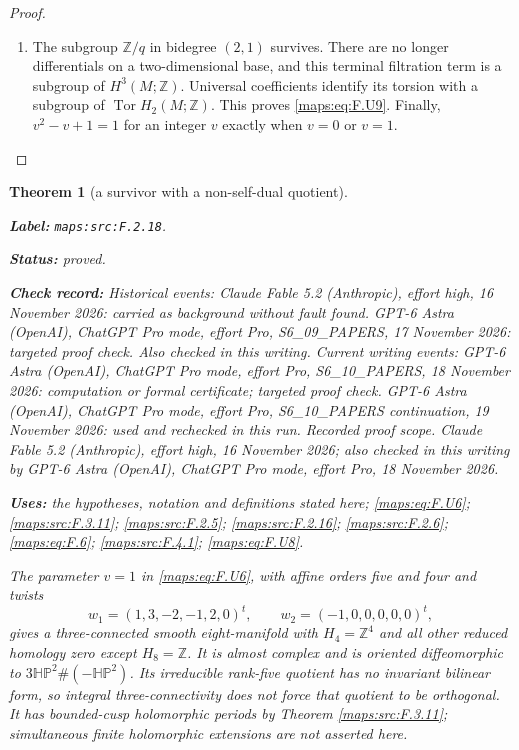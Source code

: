 \documentclass[11pt,a4paper]{article}
\newtheorem{theorem}{Theorem}[section]
\theoremstyle{definition}
\newcommand{\StatementRecord}[4]{\par\smallskip\begingroup\upshape\raggedright\noindent\textbf{Label:} \nolinkurl{#1}.\par\noindent\textbf{Status:} #2.\par\noindent\textbf{Check record:} #3.\par\noindent\textbf{Uses:} #4.\par\endgroup\smallskip}
\begin{document}
\begin{proof}
\begin{enumerate}[label=\arabic*.]
\item The subgroup $\mathbb Z/q$ in bidegree $(2,1)$ survives.
There are no longer differentials on a two-dimensional base,
and this terminal filtration term is a subgroup of
$H^3(M;\mathbb Z)$.  Universal coefficients identify its
torsion with a subgroup of $\operatorname{Tor}H_2(M;\mathbb Z)$.
This proves \eqref{maps:eq:F.U9}.  Finally, $v^2-v+1=1$ for an integer $v$
exactly when $v=0$ or $v=1$.

\end{enumerate}
\end{proof}




\begin{theorem}[a survivor with a non-self-dual quotient]\label{maps:src:F.2.18}
\StatementRecord{maps:src:F.2.18}{proved}{Historical events: Claude Fable 5.2 (Anthropic), effort high, 16 November 2026: carried as background without fault found. GPT-6 Astra (OpenAI), ChatGPT Pro mode, effort Pro, S6\_09\_PAPERS, 17 November 2026: targeted proof check. Also checked in this writing. Current writing events: GPT-6 Astra (OpenAI), ChatGPT Pro mode, effort Pro, S6\_10\_PAPERS, 18 November 2026: computation or formal certificate; targeted proof check. GPT-6 Astra (OpenAI), ChatGPT Pro mode, effort Pro, S6\_10\_PAPERS continuation, 19 November 2026: used and rechecked in this run. \emph{Recorded proof scope.} Claude Fable 5.2 (Anthropic), effort high, 16 November 2026; also checked in this writing by GPT-6 Astra (OpenAI), ChatGPT Pro mode, effort Pro, 18 November 2026}{the hypotheses, notation and definitions stated here; \cref{maps:eq:F.U6}; \cref{maps:src:F.3.11}; \cref{maps:src:F.2.5}; \cref{maps:src:F.2.16}; \cref{maps:src:F.2.6}; \cref{maps:eq:F.6}; \cref{maps:src:F.4.1}; \cref{maps:eq:F.U8}}


The parameter $v=1$ in \eqref{maps:eq:F.U6}, with affine orders five and four
and twists
\[
 w_1=(1,3,-2,-1,2,0)^t,\qquad
 w_2=(-1,0,0,0,0,0)^t,
\]
gives a three-connected smooth eight-manifold with
$H_4=\mathbb Z^4$ and all other reduced homology zero except
$H_8=\mathbb Z$.  It is almost complex and is oriented
diffeomorphic to $3\mathbb{HP}^2\#(-\mathbb{HP}^2)$.
Its irreducible rank-five quotient has no invariant bilinear
form, so integral three-connectivity does not force that
quotient to be orthogonal.  It has bounded-cusp holomorphic
periods by Theorem \ref{maps:src:F.3.11}; simultaneous finite holomorphic
extensions are not asserted here.

\end{theorem}
\end{document}
